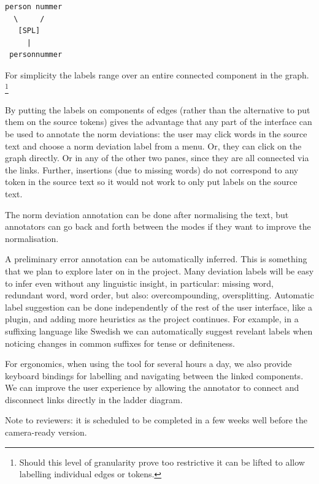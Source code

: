 \documentclass[10pt, a4paper]{article}
\newcommand{\mats}[1]{{\color{Blue}{Mats: #1}}}
\begin{document}
\begin{verbatim}
person nummer
  \     /
   [SPL]
     |
 personnummer
\end{verbatim}

For simplicity the labels range over an entire connected
component in the graph.
\footnote{Should this level of granularity prove too restrictive
it can be lifted to allow labelling individual edges or tokens.}

By putting the labels on components of edges
(rather than the alternative to put them on the source tokens) gives the advantage that any part of the interface can be used to annotate the norm deviations:
the user may click words in the source text and choose a norm deviation label from a menu. Or, they can click on the graph directly. Or in any of the other two panes,
since they are all connected via the links.
Further, insertions (due to missing words) do not correspond to any token in the source text so it would not work to only put labels on the source text.

The norm deviation annotation can be done after normalising the text, but annotators can go back and forth between the modes
if they want to improve the normalisation.

A preliminary error annotation can be automatically inferred. This is
something that we plan to explore later on in the project.
Many deviation labels will be easy to infer even without any linguistic
insight, in particular: missing word, redundant word, word order, but also:
overcompounding, oversplitting.
Automatic label suggestion can be done independently of the rest of the user interface, like a plugin, and adding more heuristics as the project continues.
For example, in a suffixing language like Swedish we can automatically suggest
revelant labels when noticing changes in common suffixes for tense or definiteness.

For ergonomics, when using the tool for several hours a day,
we also provide keyboard bindings for labelling and navigating between
the linked components.
We can improve the user experience by allowing the annotator to connect
and disconnect links directly in the ladder diagram.


Note to reviewers: it is scheduled to be completed in a few weeks well before the camera-ready version.
\end{document}
